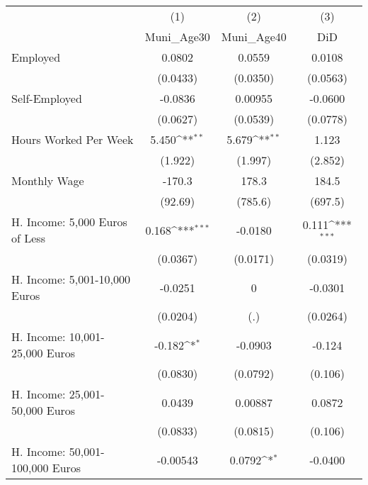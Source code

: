{
\def\sym#1{\ifmmode^{#1}\else\(^{#1}\)\fi}
\begin{tabular}{l*{3}{c}}
\hline\hline
            &\multicolumn{1}{c}{(1)}&\multicolumn{1}{c}{(2)}&\multicolumn{1}{c}{(3)}\\
            &\multicolumn{1}{c}{Muni\_Age30}&\multicolumn{1}{c}{Muni\_Age40}&\multicolumn{1}{c}{DiD}\\
\hline
Employed    &      0.0802         &      0.0559         &      0.0108         \\
            &    (0.0433)         &    (0.0350)         &    (0.0563)         \\
[1em]
Self-Employed&     -0.0836         &     0.00955         &     -0.0600         \\
            &    (0.0627)         &    (0.0539)         &    (0.0778)         \\
[1em]
Hours Worked Per Week&       5.450\sym{**} &       5.679\sym{**} &       1.123         \\
            &     (1.922)         &     (1.997)         &     (2.852)         \\
[1em]
Monthly Wage&      -170.3         &       178.3         &       184.5         \\
            &     (92.69)         &     (785.6)         &     (697.5)         \\
[1em]
H. Income: 5,000 Euros of Less&       0.168\sym{***}&     -0.0180         &       0.111\sym{***}\\
            &    (0.0367)         &    (0.0171)         &    (0.0319)         \\
[1em]
H. Income: 5,001-10,000 Euros&     -0.0251         &           0         &     -0.0301         \\
            &    (0.0204)         &         (.)         &    (0.0264)         \\
[1em]
H. Income: 10,001-25,000 Euros&      -0.182\sym{*}  &     -0.0903         &      -0.124         \\
            &    (0.0830)         &    (0.0792)         &     (0.106)         \\
[1em]
H. Income: 25,001-50,000 Euros&      0.0439         &     0.00887         &      0.0872         \\
            &    (0.0833)         &    (0.0815)         &     (0.106)         \\
[1em]
H. Income: 50,001-100,000 Euros&    -0.00543         &      0.0792\sym{*}  &     -0.0400         \\

\end{tabular}}
